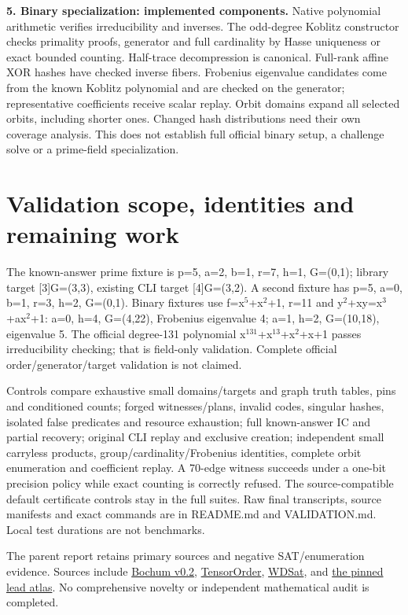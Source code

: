 \documentclass[10pt]{article}
\begin{document}
\medskip\noindent\textbf{5. Binary specialization: implemented components.}
Native polynomial arithmetic verifies irreducibility and inverses. The
odd-degree Koblitz constructor checks primality proofs, generator and full
cardinality by Hasse uniqueness or exact bounded counting. Half-trace
decompression is canonical. Full-rank affine XOR hashes have checked inverse
fibers. Frobenius eigenvalue candidates come from the known Koblitz polynomial
and are checked on the generator; representative coefficients receive scalar
replay. Orbit domains expand all selected orbits, including shorter ones.
Changed hash distributions need their own coverage analysis. This does not
establish full official binary setup, a challenge solve or a prime-field
specialization.

\section*{Validation scope, identities and remaining work}
\noindent The known-answer prime fixture is p=5, a=2, b=1, r=7, h=1,
G=(0,1); library target [3]G=(3,3), existing CLI target [4]G=(3,2).
A second fixture has p=5, a=0, b=1, r=3, h=2, G=(0,1).
Binary fixtures use f=x$^5$+x$^2$+1, r=11 and
y$^2$+xy=x$^3$+ax$^2$+1: a=0, h=4, G=(4,22), Frobenius eigenvalue 4;
a=1, h=2, G=(10,18), eigenvalue 5. The official degree-131 polynomial
x$^{131}$+x$^{13}$+x$^2$+x+1 passes irreducibility checking; that is field-only
validation. Complete official order/generator/target validation is not claimed.

\medskip\noindent Controls compare exhaustive small domains/targets and graph
truth tables, pins and conditioned counts; forged witnesses/plans, invalid
codes, singular hashes, isolated false predicates and resource exhaustion;
full known-answer IC and partial recovery; original CLI replay and exclusive
creation; independent small carryless products, group/cardinality/Frobenius
identities, complete orbit enumeration and coefficient replay. A 70-edge
witness succeeds under a one-bit precision policy while exact counting is
correctly refused. The source-compatible default certificate controls stay
in the full suites. Raw final transcripts, source manifests and exact commands
are in README.md and VALIDATION.md. Local test durations are not benchmarks.

\medskip\noindent The parent report retains primary sources and negative
SAT/enumeration evidence. Sources include
\href{https://github.com/bochum-crypto/subexponential-ecdl/tree/1ee44e562b1b9a50ea339f3b8f81112b5a24b96f}{Bochum v0.2},
\href{https://arxiv.org/abs/1908.04381}{TensorOrder},
\href{https://pmc.ncbi.nlm.nih.gov/articles/PMC7334981/}{WDSat}, and
\href{https://github.com/isogeny-labs/crypto-autoresearcher/tree/fc26d24369e56ad20995380475989c40a5e0e84f/knowledge/leads/ecdlp}{the pinned lead atlas}.
No comprehensive novelty or independent mathematical audit is completed.
\end{document}
